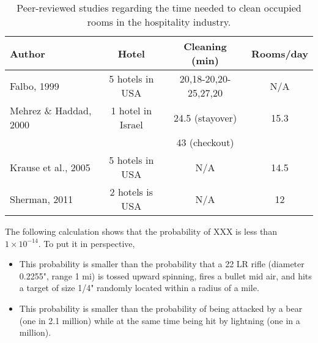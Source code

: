 \documentclass[12pt,reqno]{amsart}
\begin{document}
\begin{table}
	\begin{center}
		\begin{tabular}{||l |c |c |c||} 
		 \hline
		 Author 														& Hotel 						& Cleaning (min) 					& Rooms/day \\ [0.5ex] 
		 \hline\hline
		 Falbo, 1999 \cite{falbo1999room} 	& 5 hotels in USA 	& 20,18-20,20-25,27,20 	& N/A \\ 
		 \hline
		 Mehrez \& Haddad, 2000 \cite{mehrez2000work}	& 1 hotel in Israel & 24.5 (stayover)		& 15.3 \\
																						&										& 43 (checkout)			&				\\
		 \hline
		 Krause et al., 2005 \cite{krause2005physical} & 5 hotels in USA & N/A 											& 14.5 \\
		 \hline
		 Sherman, 2011 \cite{sherman2011beyond} & 2 hotels is USA & N/A & 12 \\
		 \hline
		\end{tabular}
	\end{center}
	\caption{Peer-reviewed studies regarding the time needed to clean occupied rooms in the hospitality industry.}
	\label{tab:Hotels}
\end{table}


The following calculation shows that the probability of XXX is less than $1\times 10^{-14}$. To put it in perspective, 
\begin{itemize}
	\item This probability is smaller than the probability that a 22 LR rifle (diameter 0.2255", range 1 mi) is tossed upward spinning, fires a bullet mid air, and hits a target of size 1/4" randomly located within a radius of a mile.  
	\item This probability is smaller than the probability of being attacked by a bear (one in 2.1 million) while at the same time being hit by lightning (one in a million). 
\end{itemize}
\end{document}
